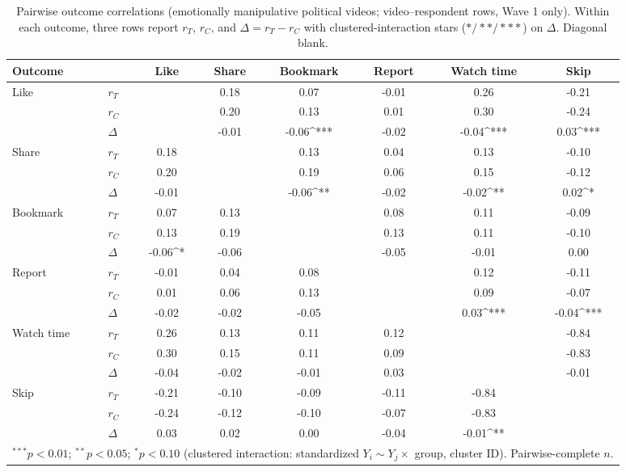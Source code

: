 \begin{table}
\begin{center}
\setlength{\tabcolsep}{4pt}
\begin{tabular}{llcccccc}
\hline
Outcome &  & Like & Share & Bookmark & Report & Watch time & Skip \\
\hline
Like & $r_{T}$ &  & 0.18 & 0.07 & -0.01 & 0.26 & -0.21 \\
 & $r_{C}$ &  & 0.20 & 0.13 & 0.01 & 0.30 & -0.24 \\
\rowcolor{ocrow}  & $\Delta$ &  & -0.01 & -0.06^{***} & -0.02 & -0.04^{***} & 0.03^{***} \\
\hline
Share & $r_{T}$ & 0.18 &  & 0.13 & 0.04 & 0.13 & -0.10 \\
 & $r_{C}$ & 0.20 &  & 0.19 & 0.06 & 0.15 & -0.12 \\
\rowcolor{ocrow}  & $\Delta$ & -0.01 &  & -0.06^{**} & -0.02 & -0.02^{**} & 0.02^{*} \\
\hline
Bookmark & $r_{T}$ & 0.07 & 0.13 &  & 0.08 & 0.11 & -0.09 \\
 & $r_{C}$ & 0.13 & 0.19 &  & 0.13 & 0.11 & -0.10 \\
\rowcolor{ocrow}  & $\Delta$ & -0.06^{*} & -0.06 &  & -0.05 & -0.01 & 0.00 \\
\hline
Report & $r_{T}$ & -0.01 & 0.04 & 0.08 &  & 0.12 & -0.11 \\
 & $r_{C}$ & 0.01 & 0.06 & 0.13 &  & 0.09 & -0.07 \\
\rowcolor{ocrow}  & $\Delta$ & -0.02 & -0.02 & -0.05 &  & 0.03^{***} & -0.04^{***} \\
\hline
Watch time & $r_{T}$ & 0.26 & 0.13 & 0.11 & 0.12 &  & -0.84 \\
 & $r_{C}$ & 0.30 & 0.15 & 0.11 & 0.09 &  & -0.83 \\
\rowcolor{ocrow}  & $\Delta$ & -0.04 & -0.02 & -0.01 & 0.03 &  & -0.01 \\
\hline
Skip & $r_{T}$ & -0.21 & -0.10 & -0.09 & -0.11 & -0.84 &  \\
 & $r_{C}$ & -0.24 & -0.12 & -0.10 & -0.07 & -0.83 &  \\
\rowcolor{ocrow}  & $\Delta$ & 0.03 & 0.02 & 0.00 & -0.04 & -0.01^{**} &  \\
\hline
\multicolumn{8}{l}{\scriptsize{$^{***}p<0.01$; $^{**}p<0.05$; $^{*}p<0.10$ (clustered interaction: standardized $Y_i \sim Y_j \times$ group, cluster ID). Pairwise-complete $n$.}} \\
\end{tabular}
\caption{Pairwise outcome correlations (emotionally manipulative political videos; video--respondent rows, Wave 1 only). Within each outcome, three rows report $r_{T}$, $r_{C}$, and $\Delta=r_{T}-r_{C}$ with clustered-interaction stars ($*/**/***$) on $\Delta$. Diagonal blank.}
\label{tab:outcome_cors_treat_ctrl}
\end{center}
\end{table}
